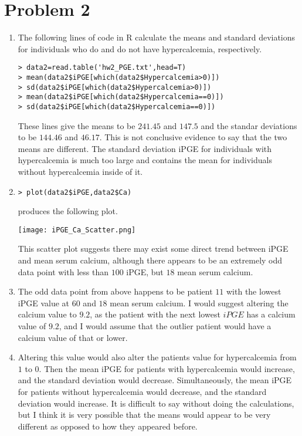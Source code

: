 \documentclass[a4paper]{article}
\begin{document}
\section*{Problem 2}

\begin{enumerate}[label=(\alph*)]
\item The following lines of code in R calculate the means and standard deviations for individuals who do and do not have hypercalcemia, respectively.
\begin{verbatim}
> data2=read.table('hw2_PGE.txt',head=T)
> mean(data2$iPGE[which(data2$Hypercalcemia>0)])
> sd(data2$iPGE[which(data2$Hypercalcemia>0)])
> mean(data2$iPGE[which(data2$Hypercalcemia==0)])
> sd(data2$iPGE[which(data2$Hypercalcemia==0)])
\end{verbatim}
These lines give the means to be $241.45$ and $147.5$ and the standar deviations to be $144.46$ and $46.17$. This is not conclusive evidence to say that the two means are different. The standard deviation iPGE for individuals with hypercalcemia is much too large and contains the mean for individuals without hypercalcemia inside of it.

\item 
\begin{verbatim}
> plot(data2$iPGE,data2$Ca)
\end{verbatim}
produces the following plot.
\begin{center}
\texttt{[image: iPGE\_Ca\_Scatter.png]}
\end{center}
This scatter plot suggests there may exist some direct trend between iPGE and mean serum calcium, although there appears to be an extremely odd data point with less than $100$ iPGE, but $18$ mean serum calcium. 

\item The odd data point from above happens to be patient $11$ with the lowest iPGE value at $60$ and $18$ mean serum calcium. I would suggest altering the calcium value to $9.2$, as the patient with the next lowest $iPGE$ has a calcium value of $9.2$, and I would assume that the outlier patient would have a calcium value of that or lower. 
\item Altering this value would also alter the patients value for hypercalcemia from $1$ to $0$. Then the mean iPGE for patients with hypercalcemia would increase, and the standard deviation would decrease. Simultaneously, the mean iPGE for patients without hypercalcemia would decrease, and the standard deviation would increase. It is difficult to say without doing the calculations, but I think it is very possible that the means would appear to be very different as opposed to how they appeared before.



























\end{enumerate}
\end{document}
